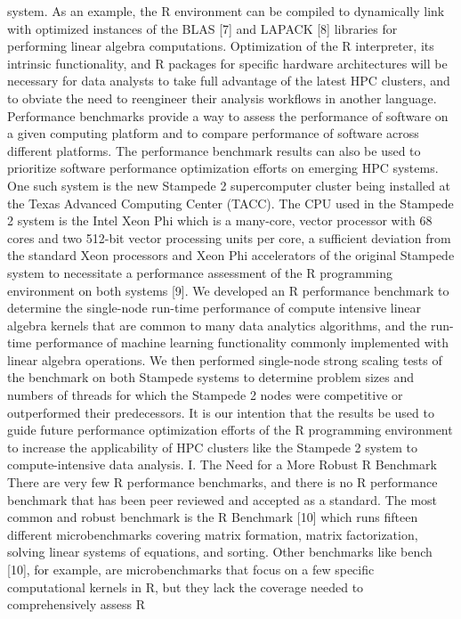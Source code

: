 system.  As an example, the R environment can be compiled to dynamically link with
optimized instances of the BLAS [7] and LAPACK [8] libraries for performing linear algebra
computations.  Optimization of the R interpreter, its intrinsic functionality, and R
packages for specific hardware architectures will be necessary for data analysts to take
full advantage of the latest HPC clusters, and to obviate the need to reengineer their
analysis workflows in another language. Performance benchmarks provide a way to assess the
performance of software on a given computing platform and to compare performance of
software across different platforms.  The performance benchmark results can also be used
to prioritize software performance optimization efforts on emerging HPC systems.  One such
system is the new Stampede 2 supercomputer cluster being installed at the Texas Advanced
Computing Center (TACC).  The CPU used in the Stampede 2 system is the Intel Xeon Phi
which is a many-core, vector processor with 68 cores and two 512-bit vector processing
units per core, a sufficient deviation from the standard Xeon processors and Xeon Phi
accelerators of the original Stampede system to necessitate a performance assessment of
the R programming environment on both systems [9].  We developed an R performance
benchmark to determine the single-node run-time performance of compute intensive linear
algebra kernels that are common to many data analytics algorithms, and the run-time
performance of machine learning functionality commonly implemented with linear algebra
operations.  We then performed single-node strong scaling tests of the benchmark on both
Stampede systems to determine problem sizes and numbers of threads for which the Stampede
2 nodes were competitive or outperformed their predecessors.  It is our intention that the
results be used to guide future performance optimization efforts of the R programming
environment to increase the applicability of HPC clusters like the Stampede 2 system to
compute-intensive data analysis. I.	The Need for a More Robust R Benchmark There are very
few R performance benchmarks, and there is no R performance benchmark that has been peer
reviewed and accepted as a standard.  The most common and robust benchmark is the R
Benchmark [10] which runs fifteen different microbenchmarks covering matrix formation,
matrix factorization, solving linear systems of equations, and sorting.  Other benchmarks
like bench [10], for example, are microbenchmarks that focus on a few specific
computational kernels in R, but they lack the coverage needed to comprehensively assess R

